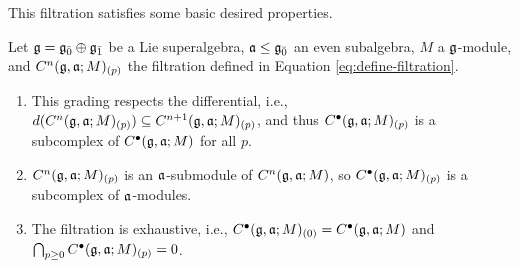 This filtration satisfies some basic desired properties.

\begin{proposition} \label{prop:grading-properties}
  Let $\mathfrak{g} = {\mathfrak{g}}_{\bar{0}} \oplus {\mathfrak{g}}_{\bar{1}}$ be a Lie superalgebra, $\mathfrak{a} \leq {\mathfrak{g}}_{\bar{0}}$ an even subalgebra, $M$ a $\mathfrak{g}$-module, and $C^n(\mathfrak{g},\mathfrak{a};M)_{(p)}$ the filtration defined in Equation \ref{eq:define-filtration}.
  \begin{enumerate}[\indent\rm (a)]
  \item This grading respects the differential, i.e., $d(C^n(\mathfrak{g},\mathfrak{a};M)_{(p)}) \subseteq C^{n+1}(\mathfrak{g},\mathfrak{a};M)_{(p)}$, and thus $C^\bullet(\mathfrak{g},\mathfrak{a};M)_{(p)}$ is a subcomplex of $C^\bullet(\mathfrak{g},\mathfrak{a};M)$ for all $p$.
  \item $C^n(\mathfrak{g},\mathfrak{a};M)_{(p)}$ is an $\mathfrak{a}$-submodule of $C^n(\mathfrak{g},\mathfrak{a};M)$, so $C^\bullet(\mathfrak{g},\mathfrak{a};M)_{(p)}$ is a subcomplex of $\mathfrak{a}$-modules.
  \item The filtration is exhaustive, i.e., $C^\bullet(\mathfrak{g},\mathfrak{a};M)_{(0)} = C^\bullet(\mathfrak{g},\mathfrak{a};M)$ and $\bigcap_{p\geq 0} C^\bullet(\mathfrak{g},\mathfrak{a};M)_{(p)} = 0$.
  \end{enumerate}
\end{proposition}
